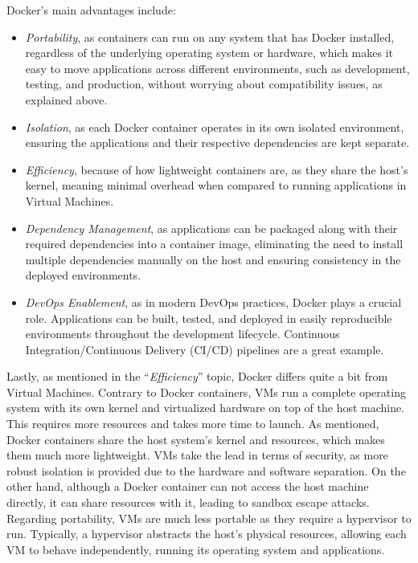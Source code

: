 Docker's main advantages include:

\begin{itemize}
    \item \textit{Portability}, as containers can run on any system that has Docker installed, regardless of the underlying operating system or hardware, which makes it easy to move applications across different environments, such as development, testing, and production, without worrying about compatibility issues, as explained above.
    \item \textit{Isolation}, as each Docker container operates in its own isolated environment, ensuring the applications and their respective dependencies are kept separate.
    \item \textit{Efficiency}, because of how lightweight containers are, as they share the host's kernel, meaning minimal overhead when compared to running applications in Virtual Machines.
    \item \textit{Dependency Management}, as applications can be packaged along with their required dependencies into a container image, eliminating the need to install multiple dependencies manually on the host and ensuring consistency in the deployed environments.
    \item \textit{DevOps Enablement}, as in modern DevOps practices, Docker plays a crucial role. Applications can be built, tested, and deployed in easily reproducible environments throughout the development lifecycle. Continuous Integration/Continuous Delivery (CI/CD) pipelines are a great example.
\end{itemize}

Lastly, as mentioned in the ``\textit{Efficiency}'' topic, Docker differs quite a bit from Virtual Machines. Contrary to Docker containers, VMs run a complete operating system with its own kernel and virtualized hardware on top of the host machine. This requires more resources and takes more time to launch. As mentioned, Docker containers share the host system's kernel and resources, which makes them much more lightweight. VMs take the lead in terms of security, as more robust isolation is provided due to the hardware and software separation.
On the other hand, although a Docker container can not access the host machine directly, it can share resources with it, leading to sandbox escape attacks. Regarding portability, VMs are much less portable as they require a hypervisor to run. Typically, a hypervisor abstracts the host's physical resources, allowing each VM to behave independently, running its operating system and applications.

